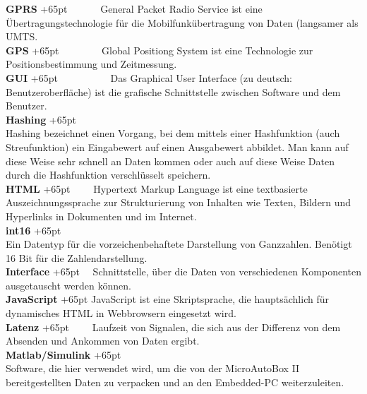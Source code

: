 \documentclass[fontsize = 12pt, paper = a4]{scrreprt}
\begin{document}
\textbf{GPRS}
\hangindent+65pt  
\ \ \ \ \ \ General Packet Radio Service ist eine Übertragungstechnologie für die Mobilfunkübertragung von Daten (langsamer als UMTS.\\

\textbf{GPS}
\hangindent+65pt  
\ \ \ \ \ \ \  \ Global Positiong System ist eine Technologie zur Positionsbestimmung und Zeitmessung.\\

\textbf{GUI}
\hangindent+65pt  
\ \ \ \ \ \ \ \ \ \   Das Graphical User Interface (zu deutsch: Benutzeroberfläche) ist die graf\-ische Schnittstelle zwischen Software und dem Benutzer.\\

\textbf{Hashing}
\hangindent+65pt  \\
Hashing bezeichnet einen Vorgang, bei dem mittels einer Hashfunktion (auch Streufunktion) ein Eingabewert auf einen Ausgabewert abbildet. Man kann auf diese Weise sehr schnell an Daten kommen oder auch auf diese Weise Daten durch die Hashfunktion verschlüsselt speichern.\\

\textbf{HTML}
\hangindent+65pt 
\ \ \ \ Hypertext Markup Language ist eine textbasierte Auszeichnungssprache zur Strukturierung von Inhalten wie Texten, Bildern und Hyperlinks in Dokumenten und im Internet.\\

\textbf{int16}
\hangindent+65pt  \\
Ein Datentyp für die vorzeichenbehaftete Darstellung von Ganzzahlen. Benötigt 16 Bit für die Zahlendarstellung.\\

\textbf{Interface}
\hangindent+65pt 
\ \ Schnittstelle, über die Daten von verschiedenen Komponenten ausgetauscht werden können.\\

\textbf{JavaScript}
\hangindent+65pt 
JavaScript ist eine Skriptsprache, die hauptsächlich für dynamisches HTML in Webbrowsern eingesetzt wird. \\

\textbf{Latenz}
\hangindent+65pt 
\ \ \ \ Laufzeit von Signalen, die sich aus der Differenz von dem Absenden und Ankommen von Daten ergibt.\\

\textbf{Matlab/Simulink}
\hangindent+65pt  \\
Software, die hier verwendet wird, um die von der MicroAutoBox II bereitgestellten Daten zu verpacken und an den Embedded-PC weiterzuleiten.\\
\end{document}
